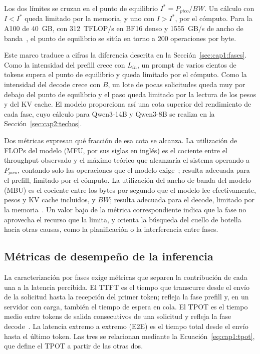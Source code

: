 Los dos límites se cruzan en el punto de equilibrio $I^{*} = P_{pico} / BW$. Un cálculo con $I < I^{*}$ queda limitado por la memoria, y uno con $I > I^{*}$, por el cómputo. Para la A100 de 40~GB, con 312~TFLOP/s en BF16 denso y 1555~GB/s de ancho de banda~\cite{nvidia2021a100}, el punto de equilibrio se sitúa en torno a 200 operaciones por byte.

Este marco traduce a cifras la diferencia descrita en la Sección~\ref{sec:cap1:fases}. Como la intensidad del prefill crece con $L_{in}$, un prompt de varios cientos de tokens supera el punto de equilibrio y queda limitado por el cómputo. Como la intensidad del decode crece con $B$, un lote de pocas solicitudes queda muy por debajo del punto de equilibrio y el paso queda limitado por la lectura de los pesos y del KV cache. El modelo proporciona así una cota superior del rendimiento de cada fase, cuyo cálculo para Qwen3-14B y Qwen3-8B se realiza en la Sección~\ref{sec:cap2:techos}.

Dos métricas expresan qué fracción de esa cota se alcanza. La utilización de FLOPs del modelo (MFU, por sus siglas en inglés) es el cociente entre el throughput observado y el máximo teórico que alcanzaría el sistema operando a $P_{pico}$, contando solo las operaciones que el modelo exige~\cite{chowdhery2023palm}; resulta adecuada para el prefill, limitado por el cómputo. La utilización del ancho de banda del modelo (MBU) es el cociente entre los bytes por segundo que el modelo lee efectivamente, pesos y KV cache incluidos, y $BW$; resulta adecuada para el decode, limitado por la memoria~\cite{agarwal2023llminference}. Un valor bajo de la métrica correspondiente indica que la fase no aprovecha el recurso que la limita, y orienta la búsqueda del cuello de botella hacia otras causas, como la planificación o la interferencia entre fases.

\subsection{Métricas de desempeño de la inferencia}
\label{sec:cap1:metricas}

La caracterización por fases exige métricas que separen la contribución de cada una a la latencia percibida. El TTFT es el tiempo que transcurre desde el envío de la solicitud hasta la recepción del primer token; refleja la fase prefill y, en un servidor con carga, también el tiempo de espera en cola. El TPOT es el tiempo medio entre tokens de salida consecutivos de una solicitud y refleja la fase decode~\cite{zhong2024distserve}. La latencia extremo a extremo (E2E) es el tiempo total desde el envío hasta el último token. Las tres se relacionan mediante la Ecuación~\ref{eq:cap1:tpot}, que define el TPOT a partir de las otras dos.

